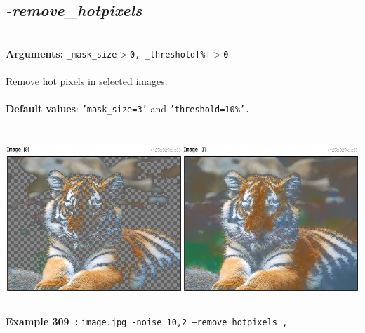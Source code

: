 \documentclass[a4paper,11pt,twoside]{book}
\begin{document}
\subsection{\emph{-remove\_hotpixels} }\vspace*{-0.5em}
~\\\textbf{Arguments: } 
{\small \texttt{\_mask\_size$>$0, \_threshold[\%]$>$0}}\\~\\
Remove hot pixels in selected images.
~\\~\\\textbf{Default values}: {\small \texttt{'mask\_size=3'} and \texttt{'threshold=10\%'.}}
\begin{center}\includegraphics[keepaspectratio=true,height=7cm,width=\textwidth]{img/gmic_def309.jpg}\\
{\footnotesize \textbf{Example 309~:} \texttt{image.jpg -noise 10,2 --remove\_hotpixels ,}}
\end{center}
\end{document}
